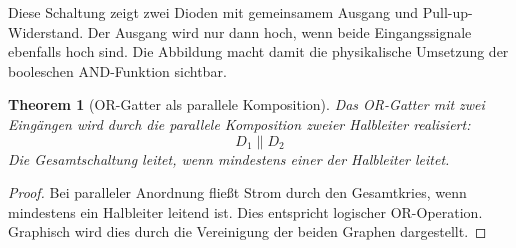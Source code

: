 \documentclass[12pt, a4paper]{article}
\newtheorem{theorem}{Theorem}[section]
\theoremstyle{definition}
\theoremstyle{remark}
\begin{document}
Diese Schaltung zeigt zwei Dioden mit gemeinsamem Ausgang und Pull-up-Widerstand. Der Ausgang wird nur dann hoch, wenn beide Eingangssignale ebenfalls hoch sind. Die Abbildung macht damit die physikalische Umsetzung der booleschen AND-Funktion sichtbar.

 
 
 
 
 

\begin{theorem}[OR-Gatter als parallele Komposition]
\label{thm:or_gatter}
Das OR-Gatter mit zwei Eingängen wird durch die parallele Komposition zweier Halbleiter realisiert:
\[
  D_1 \parallel D_2
\]
Die Gesamtschaltung leitet, wenn mindestens einer der Halbleiter leitet.
\end{theorem}

\begin{proof}
Bei paralleler Anordnung fließt Strom durch den Gesamtkries, wenn mindestens ein Halbleiter leitend ist. Dies entspricht logischer OR-Operation. Graphisch wird dies durch die Vereinigung der beiden Graphen dargestellt.
\end{proof}
\end{document}
